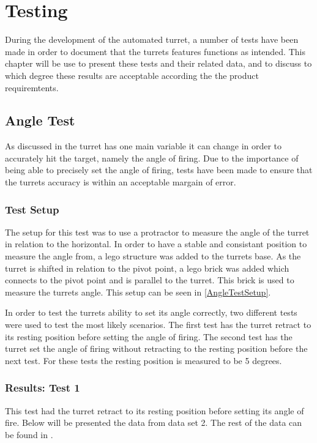 \chapter{Testing}
During the development of the automated turret, a number of tests have been made
in order to document that the turrets features functions as intended. This
chapter will be use to present these tests and their related data, and to
discuss to which degree these results are acceptable according the the product
requiremtents.

\section{Angle Test}
As discussed in  the turret has one main variable it can
change in order to accurately hit the target, namely the angle of firing. Due to the
importance of being able to precisely set the angle of firing, tests have been
made to ensure that the turrets accuracy is within an acceptable margain of
error.

\subsection{Test Setup}
The setup for this test was to use a protractor to measure the angle of the
turret in relation to the horizontal. In order to have a stable and
consistant position to measure the angle from, a lego structure was added to the
turrets base. As the turret is shifted in relation to the pivot point, a lego
brick was added which connects to the pivot point and is parallel to the turret.
This brick is used to measure the turrets angle. This setup can be seen in
\autoref{AngleTestSetup}.


In order to test the turrets ability to set its angle correctly, two different
tests were used to test the most likely scenarios. The first test has the turret
retract to its resting position before setting the angle of firing. The second
test has the turret set the angle of firing without retracting to the resting
position before the next test. For these tests the resting position is measured
to be 5 degrees.

\subsection{Results: Test 1}
This test had the turret retract to its resting position before setting its
angle of fire. Below will be presented the data from data set 2. The rest
of the data can be found in .

